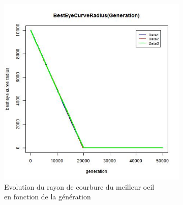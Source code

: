\documentclass[a4paper,11pt]{article}
\begin{document}


\begin{figure}
\centering
\begin{subfigure}{.5\textwidth}
  \centering
\includegraphics[width=1\linewidth]{best_eye_curve_radius.jpeg}
\caption{Evolution du rayon de courbure du meilleur oeil \\en fonction de la génération}
\label{fig:best_3}
\end{subfigure}%
\begin{subfigure}{.5\textwidth}
  \centering

\end{subfigure}
\end{figure}
\end{document}
